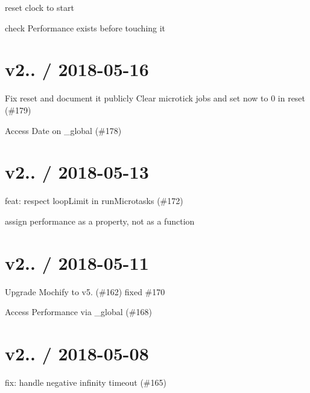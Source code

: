 \begin{DoxyItemize}
\item reset clock to start
\item check Performance exists before touching it
\end{DoxyItemize}

\section*{v2.. / 2018-\/05-\/16 }


\begin{DoxyItemize}
\item Fix {\ttfamily reset} and document it publicly Clear microtick jobs and set now to 0 in reset (\#179)
\item Access Date on {\ttfamily \+\_\+global} (\#178)
\end{DoxyItemize}

\section*{v2.. / 2018-\/05-\/13 }


\begin{DoxyItemize}
\item feat\+: respect loop\+Limit in run\+Microtasks (\#172)
\item assign performance as a property, not as a function
\end{DoxyItemize}

\section*{v2.. / 2018-\/05-\/11 }


\begin{DoxyItemize}
\item Upgrade Mochify to v5. (\#162) fixed \#170
\item Access {\ttfamily Performance} via {\ttfamily \+\_\+global} (\#168)
\end{DoxyItemize}

\section*{v2.. / 2018-\/05-\/08 }


\begin{DoxyItemize}
\item fix\+: handle negative infinity timeout (\#165)
\end{DoxyItemize}

